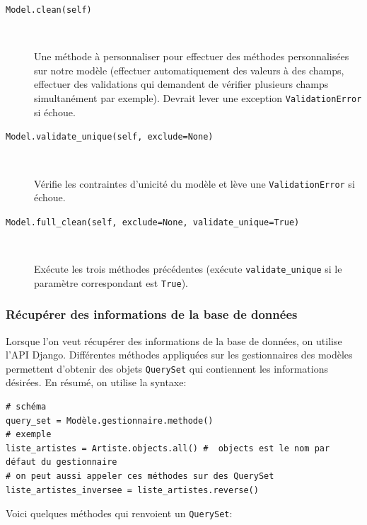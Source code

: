 \documentclass[a4paper, 10pt]{article}
\begin{document}
{\begin{description}
    \item[\texttt{Model.clean(self)}]~

    Une méthode à personnaliser pour effectuer des méthodes personnalisées sur notre modèle (effectuer automatiquement des valeurs à des champs, effectuer des validations qui demandent de vérifier plusieurs champs simultanément par exemple). Devrait lever une exception \texttt{ValidationError} si échoue.

    \item[\texttt{Model.validate_unique(self, exclude=None)}]~

    Vérifie les contraintes d'unicité du modèle et lève une \texttt{ValidationError} si échoue.

    \item[\texttt{Model.full_clean(self, exclude=None, validate_unique=True)}]~

    Exécute les trois méthodes précédentes (exécute \texttt{validate\_unique} si le paramètre correspondant est \texttt{True}).
\end{description}

\subsubsection{Récupérer des informations de la base de données}
Lorsque  l'on veut récupérer des informations de la base de données, on utilise l'API Django. Différentes méthodes appliquées sur les gestionnaires des modèles permettent d'obtenir des objets \texttt{QuerySet} qui contiennent les informations désirées. En résumé, on utilise la syntaxe:
\begin{verbatim}
# schéma
query_set = Modèle.gestionnaire.methode()
# exemple
liste_artistes = Artiste.objects.all() #  objects est le nom par défaut du gestionnaire
# on peut aussi appeler ces méthodes sur des QuerySet
liste_artistes_inversee = liste_artistes.reverse()
\end{verbatim}
 Voici quelques méthodes qui renvoient un \texttt{QuerySet}:

}
\end{document}
